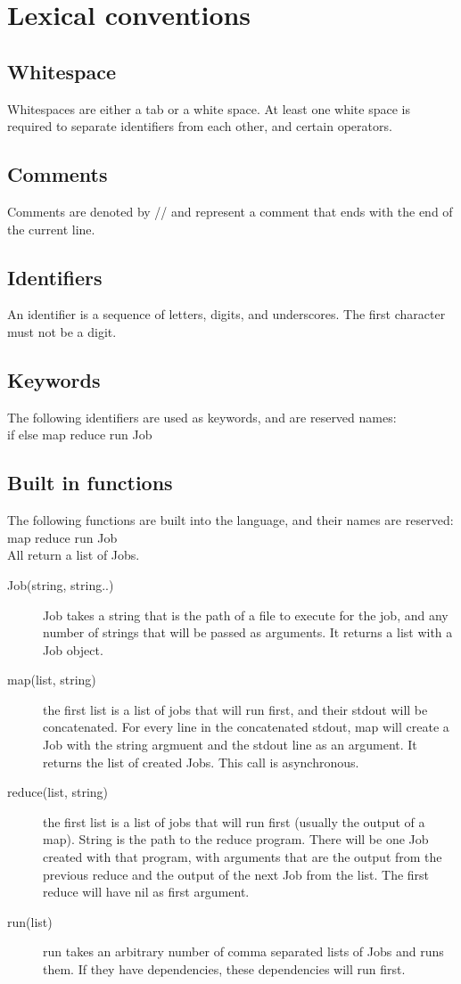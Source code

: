 \documentclass[12pt]{article}
\begin{document}
\section{Lexical conventions}
\subsection{Whitespace}
Whitespaces are either a tab or a white space. At least one white space is required to separate identifiers from
each other, and certain operators.

\subsection{Comments}
Comments are denoted by // and represent a comment that ends with the end of the current line.

\subsection{Identifiers}
An identifier is a sequence of letters, digits, and underscores. The first character must not be a digit.

\subsection{Keywords}
The following identifiers are used as keywords, and are reserved names:\\
if else map reduce run Job

\subsection{Built in functions}
The following functions are built into the language, and their names are reserved:\\
map reduce run Job\\
All return a list of Jobs.
\begin{description}
  \item[Job(string, string..)] Job takes a string that is the path of a file to
    execute for the job, and any number of strings that will be passed as
    arguments. It returns a list with a Job object.
  \item[map(list, string)] the first list is a list of jobs that will run first, and their
    stdout will be concatenated. For every line in the concatenated stdout, map will create
    a Job with the string argmuent and the stdout line as an argument. It returns the list
    of created Jobs. This call is asynchronous.
  \item[reduce(list, string)] the first list is a list of jobs that will run first (usually the
    output of a map). String is the path to the reduce program. There will be one Job
    created with that program, with arguments that are the output from the previous reduce and
    the output of the next Job from the list. The first reduce will have nil as first argument.
  \item[run(list)] run takes an arbitrary number of comma separated lists of Jobs
    and runs them. If they have dependencies, these dependencies will run first.
\end{description}
\end{document}
